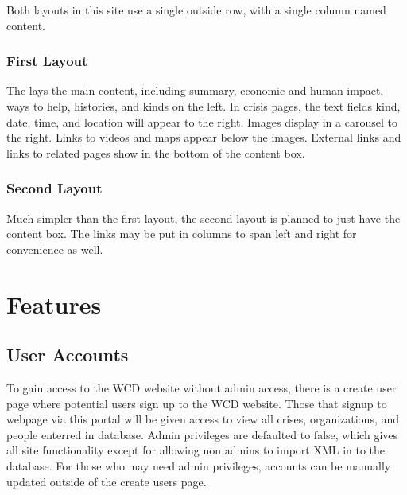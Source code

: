 \documentclass[12pt]{report}
\begin{document}
Both layouts in this site use a single outside row, with a single column named content.
\\


\subsubsection*{First Layout}
The lays the main content, including summary, economic and human impact,
ways to help, histories, and kinds on the left.
In crisis pages, the text fields kind, date, time, and location will appear to the right.
Images display in a carousel to the right.
Links to videos and maps appear below the images.
External links and links to related pages show in the bottom of the content box.
\\


\subsubsection*{Second Layout}
Much simpler than the first layout, the second layout is planned to just have the content box.
The links may be put in columns to span left and right for convenience as well.
\\


\newpage
\section*{Features}
\hfill


\subsection*{User Accounts}
\hfill

To gain access to the WCD website without admin access, there is a create user page where potential users sign up to the WCD website. Those that signup to webpage via this portal will be given access to view all crises, organizations, and people enterred in database. Admin privileges are defaulted to false, which gives all site functionality except for allowing non admins to import XML in to the database. For those who may need admin privileges, accounts can be manually updated outside of the create users page. 

\end{document}
